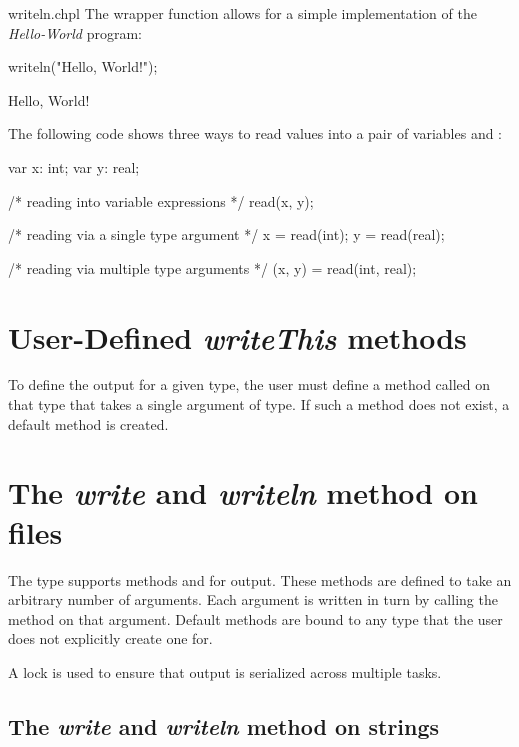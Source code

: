 \begin{chapelexample}{writeln.chpl}
The  wrapper function allows for a simple implementation
of the {\em Hello-World} program:
\begin{chapel}
writeln("Hello, World!");
\end{chapel}
\begin{chapelprintoutput}
Hello, World!
\end{chapelprintoutput}
\end{chapelexample}

\begin{example}
The following code shows three ways to read values into a pair of
variables  and :
\begin{chapel}
var x: int;
var y: real;

/* reading into variable expressions */
read(x, y);

/* reading via a single type argument */
x = read(int);
y = read(real);

/* reading via multiple type arguments */
(x, y) = read(int, real);
\end{chapel}
\end{example}

\section{User-Defined {\em writeThis} methods}

To define the output for a given type, the user must define a method
called  on that type that takes a single argument of
 type.  If such a method does not exist, a default method is
created.

\section{The {\em write} and {\em writeln} method on files}
\label{filewrite}

The  type supports methods  and 
for output.  These methods are defined to take an arbitrary number of
arguments.  Each argument is written in turn by calling
the  method on that argument.
Default  methods are bound to any type that the user
does not explicitly create one for.

A lock is used to ensure that output is serialized across multiple
tasks.

\subsection{The {\em write} and {\em writeln} method on strings}
\label{stringwrite}

